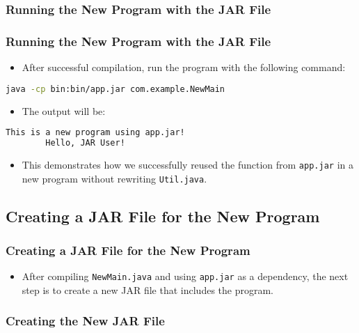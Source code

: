 \documentclass[aspectratio=169, table]{beamer}
\begin{document}
\subsubsection{Running the New Program with the JAR File}

\begin{frame}[fragile]
	\frametitle{Running the New Program with the JAR File}
	\begin{itemize}
		\item After successful compilation, run the program with the following command:
	\end{itemize}
	\begin{lstlisting}[language=bash]
		java -cp bin:bin/app.jar com.example.NewMain
	\end{lstlisting}
	\begin{itemize}
		\item The output will be:
	\end{itemize}
	\begin{lstlisting}[language=bash]
		This is a new program using app.jar!
		Hello, JAR User!
	\end{lstlisting}
	\begin{itemize}
		\item This demonstrates how we successfully reused the function from \texttt{app.jar} in a new program without rewriting \texttt{Util.java}.
	\end{itemize}
\end{frame}

\subsection{Creating a JAR File for the New Program}

\begin{frame}
	\frametitle{Creating a JAR File for the New Program}
	\begin{itemize}
		\item After compiling \texttt{NewMain.java} and using \texttt{app.jar} as a dependency, the next step is to create a new JAR file that includes the program.
	\end{itemize}
\end{frame}

\subsubsection{Creating the New JAR File}
\end{document}
